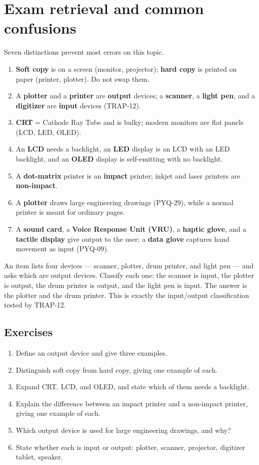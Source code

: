 \section{Exam retrieval and common confusions}
Seven distinctions prevent most errors on this topic.
\begin{enumerate}
  \item \textbf{Soft copy} is on a screen (monitor, projector); \textbf{hard
    copy} is printed on paper (printer, plotter). Do not swap them.
  \item A \textbf{plotter} and a \textbf{printer} are \textbf{output} devices;
    a \textbf{scanner}, a \textbf{light pen}, and a \textbf{digitizer} are
    \textbf{input} devices (TRAP-12).
  \item \textbf{CRT} = Cathode Ray Tube and is bulky; modern monitors are flat
    panels (LCD, LED, OLED).
  \item An \textbf{LCD} needs a backlight, an \textbf{LED} display is an LCD
    with an LED backlight, and an \textbf{OLED} display is self-emitting with
    no backlight.
  \item A \textbf{dot-matrix} printer is an \textbf{impact} printer; inkjet
    and laser printers are \textbf{non-impact}.
  \item A \textbf{plotter} draws large engineering drawings (PYQ-29), while a
    normal printer is meant for ordinary pages.
  \item A \textbf{sound card}, a \textbf{Voice Response Unit (VRU)}, a
    \textbf{haptic glove}, and a \textbf{tactile display} give output to the
    user; a \textbf{data glove} captures hand movement as input (PYQ-09).
\end{enumerate}

\begin{example}
An item lists four devices --- scanner, plotter, drum printer, and light pen
--- and asks which are output devices. Classify each one: the scanner is
input, the plotter is output, the drum printer is output, and the light pen is
input. The answer is the plotter and the drum printer. This is exactly the
input/output classification tested by TRAP-12.
\end{example}

\subsection*{Exercises}
\begin{enumerate}[label=\arabic*.]
  \item Define an output device and give three examples.
  \item Distinguish soft copy from hard copy, giving one example of each.
  \item Expand CRT, LCD, and OLED, and state which of them needs a backlight.
  \item Explain the difference between an impact printer and a non-impact
    printer, giving one example of each.
  \item Which output device is used for large engineering drawings, and why?
  \item State whether each is input or output: plotter, scanner, projector,
    digitizer tablet, speaker.
\end{enumerate}

